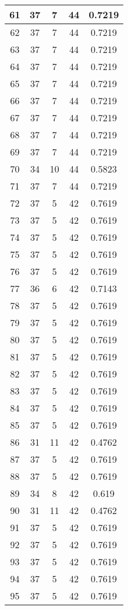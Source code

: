 \documentclass[letterpaper, 12pt]{article}
\begin{document}
\begin{longtable}{|c|c|c|c|c|}
\hline
61 & 37 & 7 & 44 & 0.7219 \\
\hline
62 & 37 & 7 & 44 & 0.7219 \\
\hline
63 & 37 & 7 & 44 & 0.7219 \\
\hline
64 & 37 & 7 & 44 & 0.7219 \\
\hline
65 & 37 & 7 & 44 & 0.7219 \\
\hline
66 & 37 & 7 & 44 & 0.7219 \\
\hline
67 & 37 & 7 & 44 & 0.7219 \\
\hline
68 & 37 & 7 & 44 & 0.7219 \\
\hline
69 & 37 & 7 & 44 & 0.7219 \\
\hline
70 & 34 & 10 & 44 & 0.5823 \\
\hline
71 & 37 & 7 & 44 & 0.7219 \\
\hline
72 & 37 & 5 & 42 & 0.7619 \\
\hline
73 & 37 & 5 & 42 & 0.7619 \\
\hline
74 & 37 & 5 & 42 & 0.7619 \\
\hline
75 & 37 & 5 & 42 & 0.7619 \\
\hline
76 & 37 & 5 & 42 & 0.7619 \\
\hline
77 & 36 & 6 & 42 & 0.7143 \\
\hline
78 & 37 & 5 & 42 & 0.7619 \\
\hline
79 & 37 & 5 & 42 & 0.7619 \\
\hline
80 & 37 & 5 & 42 & 0.7619 \\
\hline
81 & 37 & 5 & 42 & 0.7619 \\
\hline
82 & 37 & 5 & 42 & 0.7619 \\
\hline
83 & 37 & 5 & 42 & 0.7619 \\
\hline
84 & 37 & 5 & 42 & 0.7619 \\
\hline
85 & 37 & 5 & 42 & 0.7619 \\
\hline
86 & 31 & 11 & 42 & 0.4762 \\
\hline
87 & 37 & 5 & 42 & 0.7619 \\
\hline
88 & 37 & 5 & 42 & 0.7619 \\
\hline
89 & 34 & 8 & 42 & 0.619 \\
\hline
90 & 31 & 11 & 42 & 0.4762 \\
\hline
91 & 37 & 5 & 42 & 0.7619 \\
\hline
92 & 37 & 5 & 42 & 0.7619 \\
\hline
93 & 37 & 5 & 42 & 0.7619 \\
\hline
94 & 37 & 5 & 42 & 0.7619 \\
\hline
95 & 37 & 5 & 42 & 0.7619 \\

\end{longtable}
\end{document}
